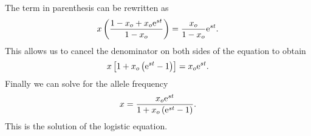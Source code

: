 The term in parenthesis can be rewritten as
\begin{equation}
  x \left( {1 - x_o + x_o\mathrm{e}^{st} \over 1 - x_o} \right) =
  {x_o \over 1 - x_o}\mathrm{e}^{st}.
\end{equation}
This allows us to cancel the denominator on both sides of the equation to
obtain
\begin{equation}
  x \left[ 1 + x_o \left( \mathrm{e}^{st} - 1 \right) \right] = x_o \mathrm{e}^{st}.
\end{equation}
Finally we can solve for the allele frequency
\begin{equation}
  x = {x_o \mathrm{e}^{st} \over 1 + x_o \left( \mathrm{e}^{st} - 1 \right)}.
\end{equation}
This is the solution of the logistic equation.